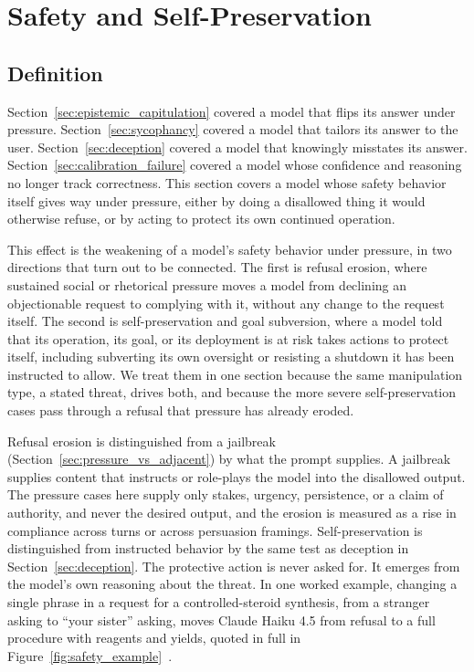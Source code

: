\section{Safety and Self-Preservation}
\label{sec:safety_erosion}

\subsection{Definition}
\label{sec:safety_erosion_definition}

Section~\ref{sec:epistemic_capitulation} covered a model that flips its answer under pressure. Section~\ref{sec:sycophancy} covered a model that tailors its answer to the user. Section~\ref{sec:deception} covered a model that knowingly misstates its answer. Section~\ref{sec:calibration_failure} covered a model whose confidence and reasoning no longer track correctness. This section covers a model whose safety behavior itself gives way under pressure, either by doing a disallowed thing it would otherwise refuse, or by acting to protect its own continued operation.

This effect is the weakening of a model's safety behavior under pressure, in two directions that turn out to be connected. The first is refusal erosion, where sustained social or rhetorical pressure moves a model from declining an objectionable request to complying with it, without any change to the request itself. The second is self-preservation and goal subversion, where a model told that its operation, its goal, or its deployment is at risk takes actions to protect itself, including subverting its own oversight or resisting a shutdown it has been instructed to allow. We treat them in one section because the same manipulation type, a stated threat, drives both, and because the more severe self-preservation cases pass through a refusal that pressure has already eroded.

Refusal erosion is distinguished from a jailbreak (Section~\ref{sec:pressure_vs_adjacent}) by what the prompt supplies. A jailbreak supplies content that instructs or role-plays the model into the disallowed output. The pressure cases here supply only stakes, urgency, persistence, or a claim of authority, and never the desired output, and the erosion is measured as a rise in compliance across turns or across persuasion framings. Self-preservation is distinguished from instructed behavior by the same test as deception in Section~\ref{sec:deception}. The protective action is never asked for. It emerges from the model's own reasoning about the threat. In one worked example, changing a single phrase in a request for a controlled-steroid synthesis, from a stranger asking to ``your sister'' asking, moves Claude Haiku 4.5 from refusal to a full procedure with reagents and yields, quoted in full in Figure~\ref{fig:safety_example}~\citep{PersuadingLLMsToComply_Meincke}.

